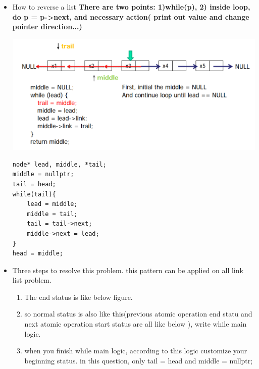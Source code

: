 \documentclass[a4paper,11pt,twoside]{book}
\begin{document}
\begin{itemize}
	\item How to reverse a list \textbf{ There are two points: 1)while(p),  2) inside loop, do p = p->next, and necessary action( print out value and change pointer direction...)}
\newline

\includegraphics[scale=0.65]{pics/reverse.png} \newline

\begin{lstlisting}[breaklines]
node* lead, middle, *tail;
middle = nullptr;
tail = head;
while(tail){
	lead = middle;
	middle = tail;
	tail = tail->next;
	middle->next = lead;
}
head = middle;
\end{lstlisting}


%
\item Three steps to resolve this problem. this pattern can be applied on all link list problem. 
\begin{enumerate}
	\item The end status is like below figure.
	
	\item so normal status is also like this(previous atomic operation end statu and next atomic operation start status are all like below ), write while main logic.
	
	\item when you finish while main logic, according to this logic customize your beginning status. in this question, only tail = head and middle = nullptr;
\end{enumerate}


\end{itemize}
\end{document}

